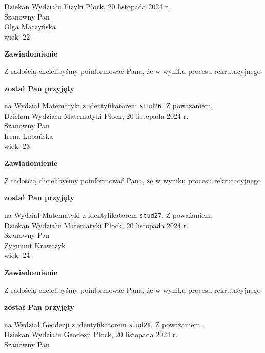 \documentclass[12pt,a4paper]{article}
\begin{document}
Dziekan
Wydziału Fizyki
\newpage
\hfill Płock, 20 listopada 2024 r.\\
\noindent 
Szanowny Pan \\
Olga Mączyńska \\
wiek: 22
\bigskip
\begin{center}
 	{\Large\textbf{Zawiadomienie}}
\end{center}
\bigskip
Z radością chcielibyśmy poinformować Pana, że w wyniku procesu rekrutacyjnego 
\begin{center}
\textsf{\textbf{został Pan przyjęty}} 
\end{center}
na Wydział Matematyki z identyfikatorem \verb|stud26|. 
\vspace{2cm}
\noindent
Z poważaniem,\\
Dziekan
Wydziału Matematyki
\newpage
\hfill Płock, 20 listopada 2024 r.\\
\noindent 
Szanowny Pan \\
Irena Lubańska  \\
wiek: 23
\bigskip
\begin{center}
 	{\Large\textbf{Zawiadomienie}}
\end{center}
\bigskip
Z radością chcielibyśmy poinformować Pana, że w wyniku procesu rekrutacyjnego 
\begin{center}
\textsf{\textbf{został Pan przyjęty}} 
\end{center}
na Wydział Matematyki z identyfikatorem \verb|stud27|. 
\vspace{2cm}
\noindent
Z poważaniem,\\
Dziekan
Wydziału Matematyki
\newpage
\hfill Płock, 20 listopada 2024 r.\\
\noindent 
Szanowny Pan \\
Zygmunt Krawczyk \\
wiek: 24
\bigskip
\begin{center}
 	{\Large\textbf{Zawiadomienie}}
\end{center}
\bigskip
Z radością chcielibyśmy poinformować Pana, że w wyniku procesu rekrutacyjnego 
\begin{center}
\textsf{\textbf{został Pan przyjęty}} 
\end{center}
na Wydział Geodezji z identyfikatorem \verb|stud28|. 
\vspace{2cm}
\noindent
Z poważaniem,\\
Dziekan
Wydziału Geodezji
\newpage
\hfill Płock, 20 listopada 2024 r.\\
\noindent 
Szanowny Pan \\
\end{document}
